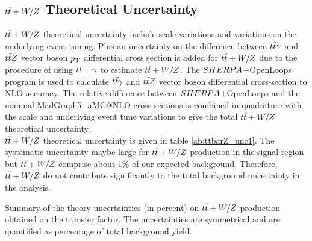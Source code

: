 \begin{table}[!h]
\begin{center}
    \end{center}
    \caption{Summary of the single-top theory uncertainties obtained in each of the signal regions. The uncertainties are computed according to the variation on the transfer factor defined in equation \ref{eq:theory_uncertainty}. The uncertainties are symmetrical and are quantified as percentage of total background yield. %
}
    \label{tab:single_top_unc3}
  \end{table}


\subsection{$t\bar{t}+W/Z$ Theoretical Uncertainty}

\indent $t\bar{t}+W/Z$ theoretical uncertainty include scale variations and variations on the underlying event tuning.  Plus an uncertainty on the difference between $t\bar{t}\gamma$ and $t\bar{t} Z$ vector boson $p_{\mathrm{T}}$ differential cross section is added for $t\bar{t}+W/Z$ due to the procedure of using $t\bar{t}+\gamma$ to estimate $t\bar{t}+W/Z$.  The $SHERPA$+OpenLoops program \cite{sherpa.OpenLoops} is used to calculate $t\bar{t} \gamma$ and $t\bar{t} Z$ vector boson differential cross-section to NLO accuracy.  The relative difference between $SHERPA$+OpenLoops and the nominal {\sc MadGraph5\_aMC\/@NLO} cross-sections is combined in quadrature with the scale and underlying event tune variations to give the total $t\bar{t}+W/Z$ theoretical uncertainty. \\

\indent $t\bar{t}+W/Z$ theoretical uncertainty is given in table \ref{ab:ttbarZ_unc1}.  The systematic uncertainty maybe large for $t\bar{t}+W/Z$ production in the signal region but $t\bar{t}+W/Z$ comprise about 1\% of our expected background. Therefore, $t\bar{t}+W/Z$ do not contribute significantly to the total background uncertainty in the analysis. \\

  \begin{table}[!h]
    \begin{center} \footnotesize
      
    \end{center}
    \caption{Summary of the theory uncertainties (in percent) on $t\bar{t}+W/Z$ production obtained on the transfer factor. The uncertainties are symmetrical and are quantified as percentage of total background yield.}
    \label{tab:ttbarZ_unc1}
  \end{table}

